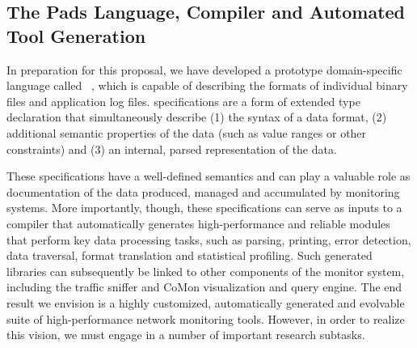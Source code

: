 \subsection{The Pads Language, Compiler and Automated Tool Generation}
\label{sec:pads}

In preparation for this proposal, we have developed a prototype
domain-specific language called
\pads{}~\cite{fisher+:pads,fisher+:popl06,mandelbaum+:pads-ml}, 
which is capable of describing
the formats of individual binary files and application log files.
\pads{} specifications are a form of extended type declaration that
simultaneously describe (1) the syntax of a data format, (2) additional
semantic properties of the data (such as value ranges or other constraints)
and (3) an internal, parsed representation of the data.  


These specifications have a well-defined semantics and can play a
valuable role as documentation of the data produced, managed and
accumulated by monitoring systems.  More importantly, though, these
specifications can serve as inputs to a compiler that automatically
generates high-performance and reliable modules that perform key data
processing tasks, such as parsing, printing, error detection, data
traversal, format translation and statistical profiling.  Such
generated libraries can subsequently be linked to other components of
the monitor system, including the traffic sniffer and CoMon
visualization and query engine.  The end result we envision is a 
highly customized, automatically generated and evolvable
suite of high-performance network monitoring
tools.  However, in order to realize this vision, we must engage
in a number of important research subtasks. 

